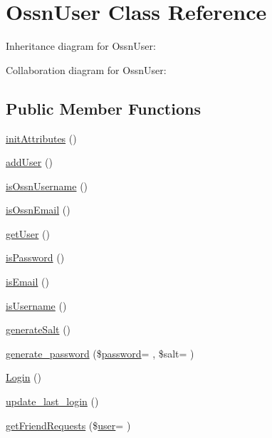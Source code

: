 \hypertarget{class_ossn_user}{}\section{Ossn\+User Class Reference}
\label{class_ossn_user}


Inheritance diagram for Ossn\+User\+:


Collaboration diagram for Ossn\+User\+:
\subsection*{Public Member Functions}
\begin{DoxyCompactItemize}
\item 
\hyperlink{class_ossn_user_a5fee6794de13185987b790fce43d0883}{init\+Attributes} ()
\item 
\hyperlink{class_ossn_user_a09efd63872d11025320bb6e18cb86020}{add\+User} ()
\item 
\hyperlink{class_ossn_user_ab5ade1c0e7eaee9f04767984a1b31491}{is\+Ossn\+Username} ()
\item 
\hyperlink{class_ossn_user_a84d07c7fa7de316f1c0cc495a4be6032}{is\+Ossn\+Email} ()
\item 
\hyperlink{class_ossn_user_ae81b7186fb97a7c6457edcc68c9aa2ef}{get\+User} ()
\item 
\hyperlink{class_ossn_user_ad118eb5e86552a7c6d00e6e390805764}{is\+Password} ()
\item 
\hyperlink{class_ossn_user_a66c5ceda86401887e89ada05c6ce32f2}{is\+Email} ()
\item 
\hyperlink{class_ossn_user_a1e97cb0ac526e6d42c669fa7d9f65bf8}{is\+Username} ()
\item 
\hyperlink{class_ossn_user_a33cc0c61820432ba8724e7e21af0a6fb}{generate\+Salt} ()
\item 
\hyperlink{class_ossn_user_ad33793eb83a7126777709b9c5aa6d1e6}{generate\+\_\+password} (\$\hyperlink{actions_2account_8php_a3ef39d3ee8b2bcca6a288308549ccb44}{password}= \textquotesingle{}\textquotesingle{}, \$salt= \textquotesingle{}\textquotesingle{})
\item 
\hyperlink{class_ossn_user_a8db48c2902872da0ee80463db6696375}{Login} ()
\item 
\hyperlink{class_ossn_user_a5d4b41552168405cfc50a3f3927c5b5f}{update\+\_\+last\+\_\+login} ()
\item 
\hyperlink{class_ossn_user_abf6dc5faf8016704040b859570dca691}{get\+Friend\+Requests} (\$\hyperlink{ossn_8config_8db_8example_8php_a802544b7ba9f79bbf24ef67773d53bed}{user}= \textquotesingle{}\textquotesingle{})

\end{DoxyCompactItemize}
